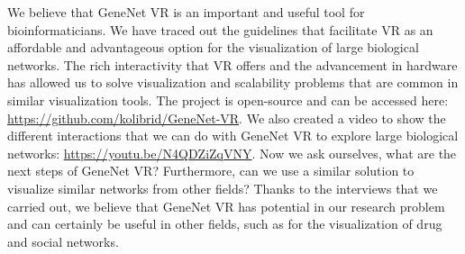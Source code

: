 We believe that GeneNet VR is an important and useful tool for bioinformaticians. We have traced out the guidelines that facilitate VR as an affordable and advantageous option for the visualization of large biological networks. The rich interactivity that VR offers and the advancement in hardware has allowed us to solve visualization and scalability problems that are common in similar visualization tools. The project is open-source and can be accessed here: \url{https://github.com/kolibrid/GeneNet-VR}. We also created a video to show the different interactions that we can do with GeneNet VR to explore large biological networks: \url{https://youtu.be/N4QDZiZqVNY}. Now we ask ourselves, what are the next steps of GeneNet VR? Furthermore, can we use a similar solution to visualize similar networks from other fields? Thanks to the interviews that we carried out, we believe that GeneNet VR has potential in our research problem and can certainly be useful in other fields, such as for the visualization of drug and social networks.
